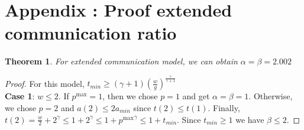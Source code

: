 \documentclass{article}
\newtheorem{theorem}{Theorem}
\begin{document}
\appendix
\newpage
\section{Appendix : Proof extended communication ratio}


\begin{theorem}
For extended communication model, we can obtain $\alpha=\beta=2.002$
\end{theorem}


\begin{proof}
For this model, $t_{min} \geq \left( \gamma+1\right)\left( \frac{w}{g} \right)^{\frac{\gamma}{\gamma+1}}$\\


\textbf{Case 1}: $w \leq 2$. 
If $p^{\max}=1$, then we chose $p=1$ and get $\alpha=\beta=1$. Otherwise, we chose $p=2$ and $a(2) \leq 2a_{min}$ since $t(2) \leq t(1)$. Finally, $t(2) = \frac{w}{2}+2^\gamma \leq 1+2^\gamma \leq 1+ {p^{\max}}^\gamma \leq 1+t_{min}$. Since $t_{min} \geq 1$ we have $\beta \leq 2$.



\end{proof}
\end{document}
